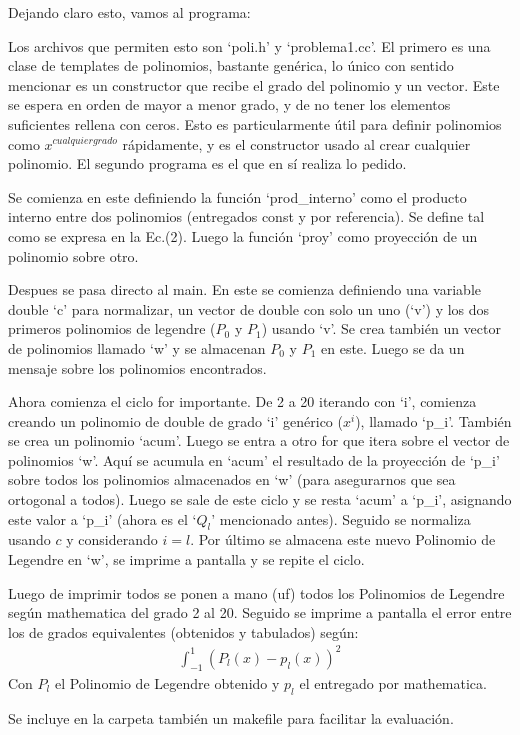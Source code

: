 \documentclass[12pt]{article}
\begin{document}
Dejando claro esto, vamos al programa:

Los archivos que permiten esto son `poli.h' y `problema1.cc'. El primero es una clase de templates de polinomios, bastante genérica, lo único con sentido mencionar es un constructor que recibe el grado del polinomio y un vector. Este se espera en orden de mayor a menor grado, y de no tener los elementos suficientes rellena con ceros. Esto es particularmente útil para definir polinomios como $x^{cualquier grado}$ rápidamente, y es el constructor usado al crear cualquier polinomio. El segundo programa es el que en sí realiza lo pedido.

Se comienza en este definiendo la función `prod\_interno' como el producto interno entre dos polinomios (entregados const y por referencia). Se define tal como se expresa en la Ec.(2). Luego la función `proy' como proyección de un polinomio sobre otro.

Despues se pasa directo al main. En este se comienza definiendo una variable double `c' para normalizar, un vector de double con solo un uno (`v') y los dos primeros polinomios de legendre ($P_0$ y $P_1$) usando `v'. Se crea también un vector de polinomios llamado `w' y se almacenan $P_0$ y $P_1$ en este. Luego se da un mensaje sobre los polinomios encontrados.

Ahora comienza el ciclo for importante. De 2 a 20 iterando con `i', comienza creando un polinomio de double de grado `i' genérico ($x^i$), llamado `p\_i'. También se crea un polinomio `acum'. Luego se entra a otro for que itera sobre el vector de polinomios `w'. Aquí se acumula en `acum' el resultado de la proyección de `p\_i' sobre todos los polinomios almacenados en `w' (para asegurarnos que sea ortogonal a todos). Luego se sale de este ciclo y se resta `acum' a `p\_i', asignando este valor a `p\_i' (ahora es el `$Q_l$' mencionado antes). Seguido se normaliza usando $c$ y considerando $i=l$. Por último se almacena este nuevo Polinomio de Legendre en `w', se imprime a pantalla y se repite el ciclo.

Luego de imprimir todos se ponen a mano (uf) todos los Polinomios de Legendre según mathematica del grado 2 al 20. Seguido se imprime a pantalla el error entre los de grados equivalentes (obtenidos y tabulados) según:
\begin{align*}
\int_{-1}^1{(P_l(x)-p_l(x))^2}
\end{align*}
Con $P_l$ el Polinomio de Legendre obtenido y $p_l$ el entregado por mathematica.

Se incluye en la carpeta también un makefile para facilitar la evaluación.
\end{document}
